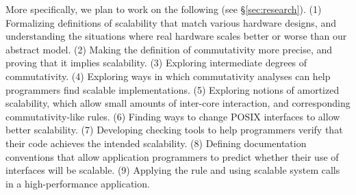 More specifically, we plan to work on the following (see
\S\ref{sec:research}).
(1) Formalizing definitions of scalability that match various
hardware designs, and understanding the situations where real
hardware scales better or worse than our abstract model.
(2) Making the definition of commutativity more precise,
and proving that it implies scalability.
(3) Exploring intermediate degrees of commutativity.
(4) Exploring ways in which commutativity analyses can help
programmers find scalable implementations.
(5) Exploring notions of amortized scalability, which allow
small amounts of inter-core interaction, and corresponding
commutativity-like rules.
(6) Finding ways to change POSIX interfaces to allow better
scalability.
(7) Developing checking tools to help programmers verify that
their code achieves the intended scalability.
(8) Defining documentation conventions that allow application
programmers to predict whether their use of interfaces will
be scalable.
(9) Applying the rule and using scalable system calls in a
high-performance application.
